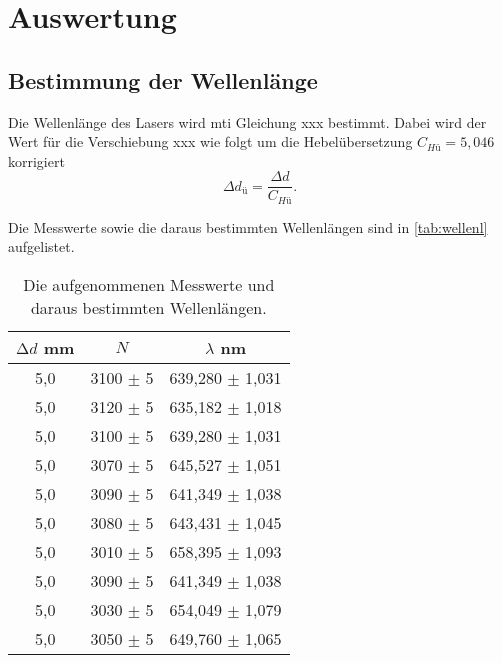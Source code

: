 \section{Auswertung}
\label{sec:Auswertung}

\subsection{Bestimmung der Wellenlänge}

Die Wellenlänge des Lasers wird mti Gleichung xxx bestimmt. 
Dabei wird der Wert für die Verschiebung xxx wie folgt um die Hebelübersetzung $C_{Hü} = 5,046$ korrigiert 
\begin{equation*}
  \Delta d_ü = \frac{\Delta d}{C_{Hü}} .
\end{equation*}

Die Messwerte sowie die daraus bestimmten Wellenlängen sind in \autoref{tab:wellenl} aufgelistet.\\

\begin{table}
    \centering
    \caption{Die aufgenommenen Messwerte und daraus bestimmten Wellenlängen.}
    \label{tab:wellenl}
    \begin{tabular}{c c c}
      \toprule
      {$\increment d$ mm} & {$N$} & {$\lambda$ nm} \\
      \midrule
      5,0     &       3100 $\pm$ 5    &   639,280 $\pm$ 1,031\\
      5,0     &       3120 $\pm$ 5    &   635,182 $\pm$ 1,018\\
      5,0     &       3100 $\pm$ 5    &   639,280 $\pm$ 1,031\\
      5,0     &       3070 $\pm$ 5    &   645,527 $\pm$ 1,051\\
      5,0     &       3090 $\pm$ 5    &   641,349 $\pm$ 1,038\\
      5,0     &       3080 $\pm$ 5    &   643,431 $\pm$ 1,045\\
      5,0     &       3010 $\pm$ 5    &   658,395 $\pm$ 1,093\\
      5,0     &       3090 $\pm$ 5    &   641,349 $\pm$ 1,038\\
      5,0     &       3030 $\pm$ 5    &   654,049 $\pm$ 1,079\\
      5,0     &       3050 $\pm$ 5    &   649,760 $\pm$ 1,065\\
      \bottomrule
    \end{tabular}
  \end{table}
  \noindent

